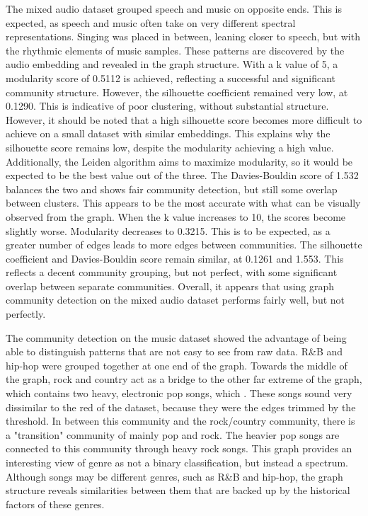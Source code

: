 \documentclass{article}
\begin{document}
The mixed audio dataset grouped speech and music on opposite ends. This is expected, as speech and music often take on very different spectral representations. Singing was placed in between, leaning closer to speech, but with the rhythmic elements of music samples. These patterns are discovered by the audio embedding and revealed in the graph structure. 
With a k value of 5, a modularity score of 0.5112 is achieved, reflecting a successful and significant community structure. However, the silhouette coefficient remained very low, at 0.1290. This is indicative of poor clustering, without substantial structure. However, it should be noted that a high silhouette score becomes more difficult to achieve on a small dataset with similar embeddings. This explains why the silhouette score remains low, despite the modularity achieving a high value. Additionally, the Leiden algorithm aims to maximize modularity, so it would be expected to be the best value out of the three. The Davies-Bouldin score of 1.532 balances the two and shows fair community detection, but still some overlap between clusters. This appears to be the most accurate with what can be visually observed from the graph.
When the k value increases to 10, the scores become slightly worse. Modularity decreases to 0.3215. This is to be expected, as a greater number of edges leads to more edges between communities. The silhouette coefficient and Davies-Bouldin score remain similar, at 0.1261 and 1.553. This reflects a decent community grouping, but not perfect, with some significant overlap between separate communities. Overall, it appears that using graph community detection on the mixed audio dataset performs fairly well, but not perfectly.

The community detection on the music dataset showed the advantage of being able to distinguish patterns that are not easy to see from raw data. R\&B and hip-hop were grouped together at one end of the graph. Towards the middle of the graph, rock and country act as a bridge to the other far extreme of the graph, which contains two heavy, electronic pop songs, which . These songs sound very dissimilar to the red of the dataset, because they were the edges trimmed by the threshold. In between
this community and the rock/country community, there is a "transition" community of mainly pop and rock. The heavier pop songs are connected to this community through heavy rock songs. This graph provides an interesting view of genre as not a binary classification, but instead a spectrum. Although songs may be different genres, such as R\&B and hip-hop, the graph structure reveals similarities between them that are backed up by the historical factors of these genres. 
\end{document}
